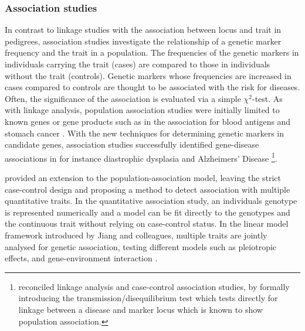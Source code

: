 \subsubsection{Association studies}
In contrast to linkage studies with the association between locus and trait in pedigrees, association studies investigate the relationship of a genetic marker frequency and the trait in a population. The frequencies of the genetic markers in individuals carrying the trait (cases) are compared to those in individuals without the trait (controls). Genetic markers whose frequencies are increased in cases compared to controls are thought to be associated with the risk for diseases. Often, the significance of the association is evaluated via a simple \(\chi ^2\)-test. As with linkage analysis, population association studies were initially limited to known genes or gene products such as in the association for blood antigens and stomach cancer \citep{Aird1953,Aird1954}. With the new techniques for determining genetic markers in candidate genes, association studies successfully identified gene-disease associations in for instance diastrophic dysplasia \citep{Hastbacka1992} and Alzheimers' Disease \citep{Strittmatter1996}\footnote{\citet{Spielman1993} reconciled linkage analysis and case-control association studies, by formally introducing the transmission/disequilibrium test which tests directly for linkage between a disease and marker locus which is known to show population association.}. 

\citet{Jiang1995} provided an extension to the population-association model, leaving the strict case-control design and proposing a method to detect association with multiple quantitative traits. In the quantitative association study, an individuals genotype is represented numerically and a model can be fit directly to the genotypes and the continuous trait without relying on case-control status. In the linear model framework introduced by Jiang and colleagues, multiple traits are jointly analysed for genetic association, testing different models such as pleiotropic effects, and gene-environment interaction \citep{Jiang1995}. 



